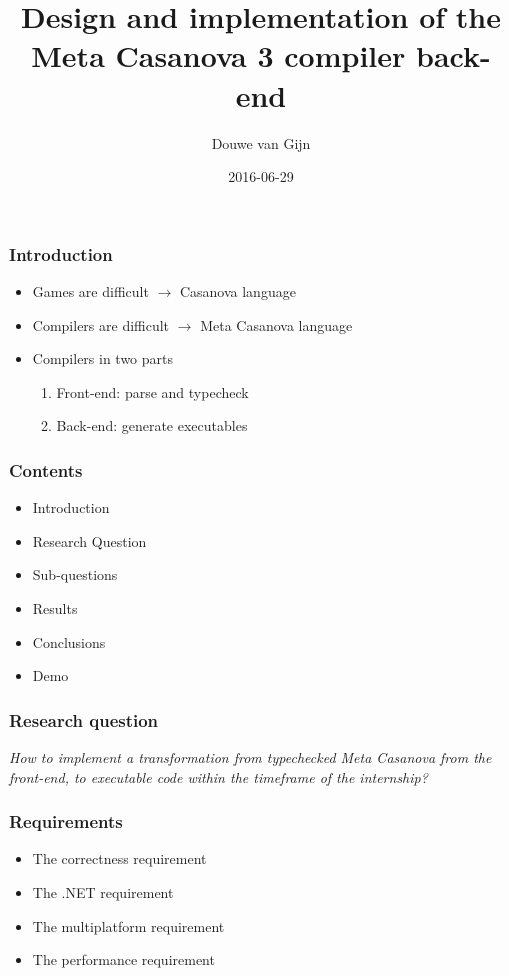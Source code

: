\documentclass[xetex,serif]{beamer}
\title{Design and implementation of the\\Meta Casanova 3 compiler back-end}
\author{Douwe van Gijn}
\date{2016-06-29}
\begin{document}
\begin{frame}
\titlepage

\end{frame}\begin{frame}\frametitle{Introduction}
\begin{itemize}
    \item Games are difficult $\longrightarrow$ Casanova language
    \item Compilers are difficult $\longrightarrow$ Meta Casanova language
    \item Compilers in two parts
    \begin{enumerate}
        \item Front-end: parse and typecheck
        \item Back-end: generate executables
    \end{enumerate}
\end{itemize}

\end{frame}\begin{frame}\frametitle{Contents}
\begin{itemize}
    \item Introduction
    \item Research Question
    \item Sub-questions
    \item Results
    \item Conclusions
    \item Demo
\end{itemize}

\end{frame}\begin{frame}\frametitle{Research question}
\textit{How to implement a transformation from typechecked Meta Casanova from the front-end, to executable code within the timeframe of the internship?}

\end{frame}\begin{frame}\frametitle{Requirements}
\begin{itemize}
    \item The correctness requirement
    \item The .NET requirement
    \item The multiplatform requirement
    \item The performance requirement
\end{itemize}


\end{frame}
\end{document}
